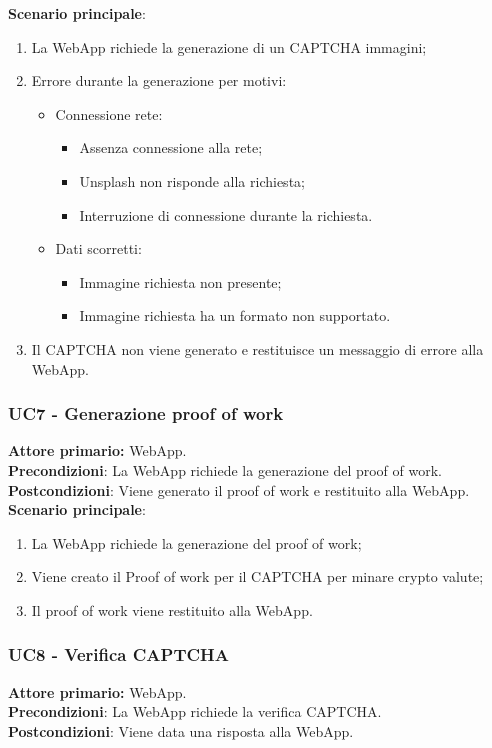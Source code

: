 \textbf{Scenario principale}:
\begin{enumerate}
    \item La WebApp richiede la generazione di un CAPTCHA immagini;
    \item Errore durante la generazione per motivi:
		\begin{itemize}
    		\item Connessione rete:
			\begin{itemize}
	    		\item Assenza connessione alla rete;
	    		\item Unsplash non risponde alla richiesta;
			\item Interruzione di connessione durante la richiesta.
			\end{itemize}
    		\item Dati scorretti:
			\begin{itemize}
	    		\item Immagine richiesta non presente;
	    		\item Immagine richiesta ha un formato non supportato.
			\end{itemize}
		\end{itemize}
    \item Il CAPTCHA non viene generato e restituisce un messaggio di errore alla WebApp.\\
\end{enumerate}

\subsubsection{UC7  - Generazione proof of work}
\textbf{Attore primario:} WebApp.\\
\textbf{Precondizioni}: La WebApp richiede la generazione del proof of work.\\
\textbf{Postcondizioni}: Viene generato il proof of work e restituito alla WebApp.\\

\textbf{Scenario principale}:
\begin{enumerate}
    \item La WebApp richiede la generazione del proof of work;
    \item Viene creato il Proof of work per il CAPTCHA per minare crypto valute;
    \item Il proof of work viene restituito alla WebApp.
\end{enumerate}

\subsubsection{UC8 - Verifica CAPTCHA}
\textbf{Attore primario:} WebApp.\\
\textbf{Precondizioni}: La WebApp richiede la verifica CAPTCHA.\\
\textbf{Postcondizioni}: Viene data una risposta alla WebApp.\\

